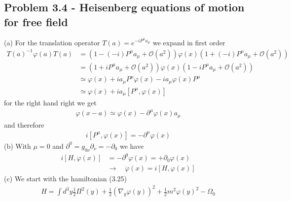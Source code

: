 \documentclass[../main.tex]{subfiles}
\begin{document}
\subsection{Problem 3.4 - Heisenberg equations of motion for free field}
(a) For the translation operator $T(a)=e^{-iP^\mu a_\mu}$ we expand in first order
\begin{align}
T(a)^{-1}\varphi(a)T(a)
&=\left(1-(-i)P^\mu a_\mu+\mathcal{O}(a^2)\right)\varphi(x)\left(1+(-i)P^\mu a_\mu+\mathcal{O}(a^2)\right)\\
&=\left(1+iP^\mu a_\mu+\mathcal{O}(a^2)\right)\varphi(x)\left(1-iP^\mu a_\mu+\mathcal{O}(a^2)\right)\\
&\simeq\varphi(x)+ia_\mu P^\mu\varphi(x)-ia_\mu\varphi(x)P^\mu\\
&\simeq\varphi(x)+ia_\mu [P^\mu,\varphi(x)]
\end{align}
for the right hand right we get
\begin{align}
\varphi(x-a)\simeq\varphi(x)-\partial^\mu \varphi(x)a_\mu
\end{align}
and therefore
\begin{align}
i[P^\mu,\varphi(x)]=-\partial^\mu\varphi(x)
\end{align}
(b) With $\mu=0$ and $\partial^0=g_{0\nu}\partial_\nu=-\partial_0$ we have
\begin{align}
i[H,\varphi(x)]&=-\partial^0\varphi(x)=+\partial_0\varphi(x)\\
&\rightarrow\quad\dot{\varphi}(x)=i[H,\varphi(x)]
\end{align}
(c) We start with the hamiltonian (3.25)
\begin{align}
H=\int d^3y\frac{1}{2}\Pi^2(y)+\frac{1}{2}(\nabla_y\varphi(y))^2+\frac{1}{2}m^2\varphi(y)^2-\Omega_0
\end{align}
\end{document}

